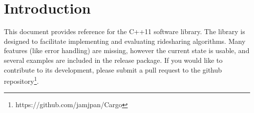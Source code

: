 \section{Introduction}

This document provides reference for the  C++11 software
library.  The library is designed to facilitate implementing and evaluating
ridesharing algorithms.  Many features (like error handling) are missing,
however the current state is usable, and several examples are included in the
release package.  If you would like to contribute to its development, please
submit a pull request to the github
repository\footnote{https://github.com/jamjpan/Cargo}.


